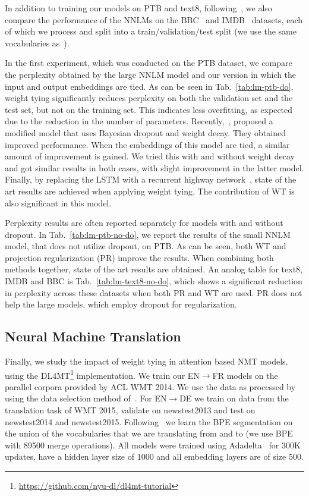 \documentclass[11pt]{article}
\begin{document}
In addition to training our models on PTB and text8, following~\cite{Miyamoto16}, we also compare the performance of the NNLMs on the BBC~\cite{BBC} and IMDB~\cite{IMDB} datasets, each of which we process and split into a train/validation/test split (we use the same vocabularies as~\cite{Miyamoto16}).  %

%

In the first experiment, which was conducted on the PTB dataset, we compare the perplexity obtained by the large NNLM model and our version in which the input and output embeddings are tied. As can be seen in Tab.~\ref{tab:lm-ptb-do}, weight tying significantly reduces perplexity on both the validation set and the test set, but not on the training set. This indicates less overfitting, as expected due to the reduction in the number of parameters. Recently,~\cite{yarin1}, proposed a modified model that uses Bayesian dropout and weight decay. They obtained improved performance. When the embeddings of this model are tied, a similar amount of improvement is gained. We tried this with and without weight decay and got similar results in both cases, with slight improvement in the latter model. Finally, by replacing the LSTM with a recurrent highway network~\cite{rhn}, state of the art results are achieved when applying weight tying. The contribution of WT is also significant in this model. %



%
Perplexity results are often reported separately for models with and without dropout. In Tab.~\ref{tab:lm-ptb-no-do}, we report the results of the small NNLM model, that does not utilize dropout, on PTB. As can be seen, both WT and projection regularization (PR) improve the results. When combining both methods together, state of the art results are obtained. An analog table for text8, IMDB and BBC is Tab.~\ref{tab:lm-text8-no-do}, which shows a significant reduction in perplexity across these datasets when both PR and WT are used. PR does not help the large models, which employ dropout for regularization. 





%
\subsection{Neural Machine Translation}
Finally, we study the impact of weight tying in attention based NMT models, using the DL4MT\footnote{\tiny \url{https://github.com/nyu-dl/dl4mt-tutorial}} implementation. %
We train our EN$\rightarrow$FR models on the parallel corpora provided by ACL WMT 2014. We use the data as processed by~\cite{cho2014learning} using the data selection method of~\cite{axelrod11}. For EN$\rightarrow$DE we train on data from the translation task of WMT 2015, validate on newstest2013 and test on newstest2014 and newstest2015. Following~\cite{bpe} we learn the BPE segmentation on the union of the vocabularies that we are translating from and to (we use BPE with 89500 merge operations). %
All models were trained using Adadelta~\cite{adadelta} for 300K updates, have a hidden layer size of 1000 and all embedding layers are of size 500. 
\end{document}
